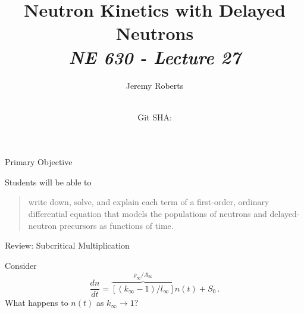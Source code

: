 \documentclass[aspectratio=1610]{beamer}
\title{Neutron Kinetics with Delayed Neutrons\\
       {\small\it NE 630 - Lecture 27}}
\date{ \\ {\footnotesize Git SHA: }}
\author{Jeremy Roberts}
\begin{document}
\begin{frame}
\titlepage
\end{frame}
 
 
\begin{frame}{Primary Objective}

Students will be able to 

\vfill

\begin{quote}
\textcolor{wcprimary}{write down, solve, and explain each term of a first-order, ordinary differential 
equation that models the populations of neutrons and delayed-neutron precursors as functions of time.
}
\end{quote}

\vfill 

\end{frame}

\begin{frame}[fragile]{Review: Subcritical Multiplication }

Consider 
\begin{equation*}
\tag{FNRP 5.22}
 \frac{dn}{dt}  = \overbrace{ [(k_{\infty} - 1)/l_{\infty}] }^{\rho_{\infty}/\Lambda_{\infty}} n(t) + S_0 \, .
\end{equation*}
What happens to $n(t)$ as $k_{\infty} \to 1$? 

\resizebox{0.9\textwidth}{!}{}

\end{frame}

 
\end{document}
